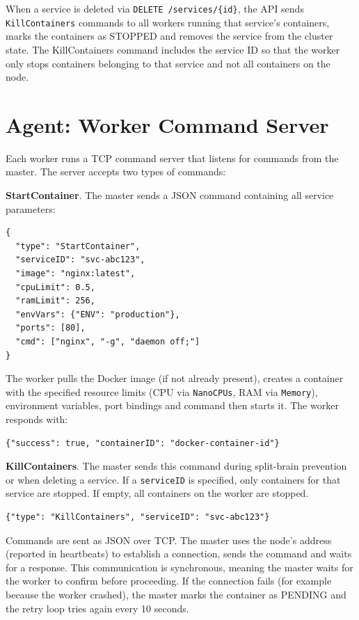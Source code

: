 When a service is deleted via \texttt{DELETE /services/\{id\}}, the API sends \texttt{KillContainers} commands to all workers running that service's containers, marks the containers as STOPPED and removes the service from the cluster state. The KillContainers command includes the service ID so that the worker only stops containers belonging to that service and not all containers on the node.

\section{Agent: Worker Command Server}

Each worker runs a TCP command server that listens for commands from the master. The server accepts two types of commands:

\textbf{StartContainer}. The master sends a JSON command containing all service parameters:

\begin{verbatim}
{
  "type": "StartContainer",
  "serviceID": "svc-abc123",
  "image": "nginx:latest",
  "cpuLimit": 0.5,
  "ramLimit": 256,
  "envVars": {"ENV": "production"},
  "ports": [80],
  "cmd": ["nginx", "-g", "daemon off;"]
}
\end{verbatim}

The worker pulls the Docker image (if not already present), creates a container with the specified resource limits (CPU via \texttt{NanoCPUs}, RAM via \texttt{Memory}), environment variables, port bindings and command then starts it. The worker responds with:

\begin{verbatim}
{"success": true, "containerID": "docker-container-id"}
\end{verbatim}

\textbf{KillContainers}. The master sends this command during split-brain prevention or when deleting a service. If a \texttt{serviceID} is specified, only containers for that service are stopped. If empty, all containers on the worker are stopped.

\begin{verbatim}
{"type": "KillContainers", "serviceID": "svc-abc123"}
\end{verbatim}

Commands are sent as JSON over TCP. The master uses the node's address (reported in heartbeats) to establish a connection, sends the command and waits for a response. This communication is synchronous, meaning the master waits for the worker to confirm before proceeding. If the connection fails (for example because the worker crashed), the master marks the container as PENDING and the retry loop tries again every 10 seconds.

